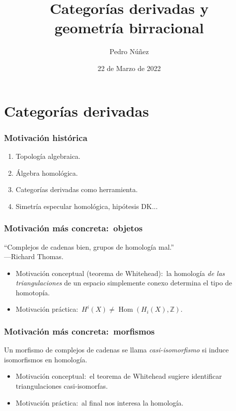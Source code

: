 \documentclass[12pt]{beamer}
\title[Categorías derivadas y geometría birracional]{Categorías derivadas y \\ geometría birracional}
\author{Pedro N\'{u}\~{n}ez}
\institute{Red de Doctorandos en Matemáticas UCM}
\date{22 de Marzo de 2022}
\begin{document}
\frame{\titlepage}

\section{Categorías derivadas}

\begin{frame}
  \frametitle{Motivación histórica}
  \begin{enumerate}
    \item Topología algebraica.
      \vspace{5mm}
      \pause

    \item Álgebra homológica.
      \vspace{5mm}
      \pause

   \item Categorías derivadas como herramienta. 
      \vspace{5mm}
      \pause

    \item Simetría especular homológica, hipótesis DK...
  \end{enumerate}
\end{frame}

\begin{frame}
  \frametitle{Motivación más concreta:~objetos}
  \begin{center}
    ``Complejos de cadenas bien, grupos de homología mal.'' \\
    \hfill ---Richard Thomas.
  \end{center}
  \pause
  \begin{itemize}
    \item Motivación conceptual (teorema de Whitehead):~la homología \textit{de las triangulaciones} de un espacio simplemente conexo determina el tipo de homotopía.
      \pause
    \item Motivación práctica:~$H^{i}(X) \neq \operatorname{Hom}(H_{i}(X),\mathbb{Z})$.
  \end{itemize}
\end{frame}

\begin{frame}
  \frametitle{Motivación más concreta:~morfismos}
  Un morfismo de complejos de cadenas se llama \textit{casi-isomorfismo} si induce isomorfismos en homología.
  \pause
  \begin{itemize}
    \item Motivación conceptual:~el teorema de Whitehead sugiere identificar triangulaciones casi-isomorfas.
      \pause
    \item Motivación práctica:~al final nos interesa la homología.
  \end{itemize}
\end{frame}
\end{document}
